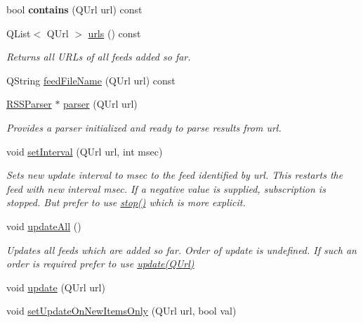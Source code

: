 \begin{DoxyCompactItemize}
\item 
\hypertarget{class_r_s_s_manager_ace1fc2397432c0c4662bdea73254d6e3}{bool {\bfseries contains} (Q\-Url url) const }\label{class_r_s_s_manager_ace1fc2397432c0c4662bdea73254d6e3}

\item 
Q\-List$<$ Q\-Url $>$ \hyperlink{class_r_s_s_manager_a2852ac2857292b9faaa3fb8a32ad8f9b}{urls} () const 
\begin{DoxyCompactList}\small\item\em Returns all U\-R\-Ls of all feeds added so far. \end{DoxyCompactList}\item 
Q\-String \hyperlink{class_r_s_s_manager_af0f068ca88b9ce7430ed879817325991}{feed\-File\-Name} (Q\-Url url) const 
\item 
\hyperlink{class_r_s_s_parser}{R\-S\-S\-Parser} $\ast$ \hyperlink{class_r_s_s_manager_ad87bd1cf9ed4380d36b23341e115d19e}{parser} (Q\-Url url)
\begin{DoxyCompactList}\small\item\em Provides a parser initialized and ready to parse results from url. \end{DoxyCompactList}\item 
void \hyperlink{class_r_s_s_manager_a61585a5b8bec73b83a6c9e5ea990e7f8}{set\-Interval} (Q\-Url url, int msec)
\begin{DoxyCompactList}\small\item\em Sets new update interval to {\itshape msec\/} to the feed identified by {\itshape url\/}. This restarts the feed with new interval {\itshape msec\/}. If a negative value is supplied, subscription is stopped. But prefer to use \hyperlink{class_r_s_s_manager_a23a3fbde5eaab58f792087a7129f1840}{stop()} which is more explicit. \end{DoxyCompactList}\item 
void \hyperlink{class_r_s_s_manager_a54cc44949de7b572cdd01bebf7ea4f6c}{update\-All} ()
\begin{DoxyCompactList}\small\item\em Updates all feeds which are added so far. Order of update is undefined. If such an order is required prefer to use \hyperlink{class_r_s_s_manager_a80026b696e3feb8414c8601f63185a17}{update(\-Q\-Url)} \end{DoxyCompactList}\item 
void \hyperlink{class_r_s_s_manager_a80026b696e3feb8414c8601f63185a17}{update} (Q\-Url url)
\item 
void \hyperlink{class_r_s_s_manager_a207ba608696040d5d594fa67eae006bd}{set\-Update\-On\-New\-Items\-Only} (Q\-Url url, bool val)

\end{DoxyCompactItemize}
